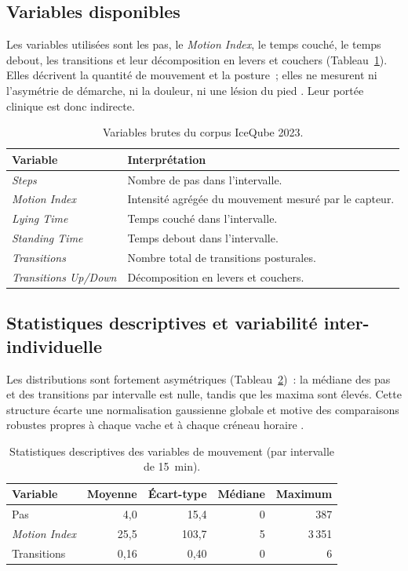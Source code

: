 \subsection{Variables disponibles}

Les variables utilisées sont les pas, le \textit{Motion Index}, le temps couché, le temps
debout, les transitions et leur décomposition en levers et couchers
(Tableau~\ref{tab:variables_brutes}). Elles décrivent la quantité de mouvement et la
posture~; elles ne mesurent ni l'asymétrie de démarche, ni la douleur, ni une lésion du
pied \citep{alsaaod2019automatic,oleary2020accelerometers}. Leur portée clinique est donc
indirecte.

\begin{table}[H]
  \centering
  \caption{Variables brutes du corpus IceQube 2023.}
  \label{tab:variables_brutes}
  \begin{tabular}{p{}p{}}
    \toprule
    Variable & Interprétation \\
    \midrule
    \textit{Steps} & Nombre de pas dans l'intervalle. \\
    \textit{Motion Index} & Intensité agrégée du mouvement mesuré par le capteur. \\
    \textit{Lying Time} & Temps couché dans l'intervalle. \\
    \textit{Standing Time} & Temps debout dans l'intervalle. \\
    \textit{Transitions} & Nombre total de transitions posturales. \\
    \textit{Transitions Up/Down} & Décomposition en levers et couchers. \\
    \bottomrule
  \end{tabular}
\end{table}

\subsection{Statistiques descriptives et variabilité inter-individuelle}

Les distributions sont fortement asymétriques (Tableau~\ref{tab:statistiques_brutes})~: la
médiane des pas et des transitions par intervalle est nulle, tandis que les maxima sont
élevés. Cette structure écarte une normalisation gaussienne globale et motive des
comparaisons robustes propres à chaque vache et à chaque créneau horaire
\citep{leys2013detecting}.

\begin{table}[H]
  \centering
  \caption{Statistiques descriptives des variables de mouvement (par intervalle de 15~min).}
  \label{tab:statistiques_brutes}
  \begin{tabular}{lrrrr}
    \toprule
    Variable & Moyenne & Écart-type & Médiane & Maximum \\
    \midrule
    Pas & 4,0 & 15,4 & 0 & 387 \\
    \textit{Motion Index} & 25,5 & 103,7 & 5 & 3\,351 \\
    Transitions & 0,16 & 0,40 & 0 & 6 \\
    \bottomrule
  \end{tabular}
\end{table}

